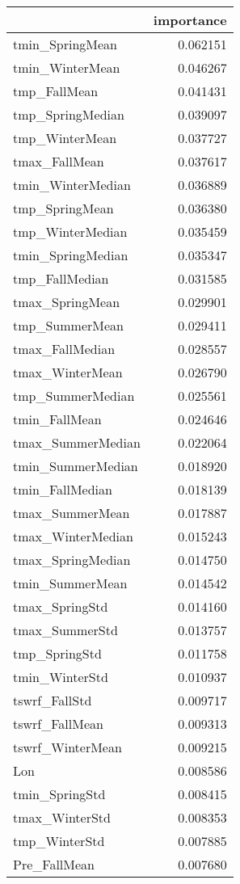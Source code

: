 \begin{tabular}{lr}
\toprule
 & importance \\
\midrule
tmin_SpringMean & 0.062151 \\
tmin_WinterMean & 0.046267 \\
tmp_FallMean & 0.041431 \\
tmp_SpringMedian & 0.039097 \\
tmp_WinterMean & 0.037727 \\
tmax_FallMean & 0.037617 \\
tmin_WinterMedian & 0.036889 \\
tmp_SpringMean & 0.036380 \\
tmp_WinterMedian & 0.035459 \\
tmin_SpringMedian & 0.035347 \\
tmp_FallMedian & 0.031585 \\
tmax_SpringMean & 0.029901 \\
tmp_SummerMean & 0.029411 \\
tmax_FallMedian & 0.028557 \\
tmax_WinterMean & 0.026790 \\
tmp_SummerMedian & 0.025561 \\
tmin_FallMean & 0.024646 \\
tmax_SummerMedian & 0.022064 \\
tmin_SummerMedian & 0.018920 \\
tmin_FallMedian & 0.018139 \\
tmax_SummerMean & 0.017887 \\
tmax_WinterMedian & 0.015243 \\
tmax_SpringMedian & 0.014750 \\
tmin_SummerMean & 0.014542 \\
tmax_SpringStd & 0.014160 \\
tmax_SummerStd & 0.013757 \\
tmp_SpringStd & 0.011758 \\
tmin_WinterStd & 0.010937 \\
tswrf_FallStd & 0.009717 \\
tswrf_FallMean & 0.009313 \\
tswrf_WinterMean & 0.009215 \\
Lon & 0.008586 \\
tmin_SpringStd & 0.008415 \\
tmax_WinterStd & 0.008353 \\
tmp_WinterStd & 0.007885 \\
Pre_FallMean & 0.007680 \\

\end{tabular}

